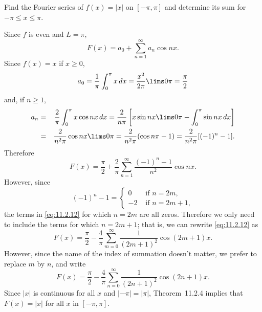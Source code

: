 \setcounter{example}{4}
\begin{example}
  \label{example:11.2.5} \rm Find the Fourier series of $f(x)=|x|$ on $[-\pi,\pi]$ and determine its sum for\\ $-\pi\le x\le\pi$.
\end{example}
\setcounter{equation}{11}
\begin{examplesolution}
\solution Since $f$ is even and $L=\pi$,
\[
  F(x)=a_{0}+\sum_{n=1}^{\infty}a_{n}\cos nx.
\]
Since $f(x)=x$ if $x\ge0$,
\[
  a_{0}=\frac{1}{\pi}\int_{0}^{\pi}x\,dx=\frac{x^{2}}{2\pi}\lims0\pi=\frac{\pi}{2}
\]
and, if $n\ge1$,
\begin{eqnarray*}
  a_{n} & = & \frac{2}{\pi}\int_{0}^{\pi}x\cos nx\,dx=\frac{2}{n\pi}\left[x\sin nx\lims0\pi-\int_{0}^{\pi}\sin nx\,dx\right] \\
        & = & \frac{2}{n^{2}\pi}\cos nx\lims0\pi=\frac{2}{n^{2}\pi}(\cos n\pi-1)=\frac{2}{n^{2}\pi}[(-1)^{n}-1].
\end{eqnarray*}
Therefore
\begin{equation}
  \label{eq:11.2.12}F(x)=\frac{\pi}{2}+\frac{2}{\pi}\sum_{n=1}^{\infty}\frac{(-1)^{n}-1}{n^{2}}\cos nx.
\end{equation}
However, since
\[
  (-1)^{n}-1= \left\{
  \begin{array}{rl}
    0  & \mbox{ if }n=2m,   \\
    -2 & \mbox{ if }n=2m+1,
  \end{array}\right.
\]
the terms in \eqref{eq:11.2.12} for which $n=2m$ are all zeros. Therefore we only need to include the
terms for which $n=2m+1$; that is, we can rewrite \eqref{eq:11.2.12} as
\[
  F(x)=\frac{\pi}{2}-\frac{4}{\pi}\sum_{m=0}^{\infty}\frac{1}{(2m+1)^{2}}\cos(2m+1)x.
\]
However, since the name of the index of summation doesn't matter, we prefer to replace $m$ by $n$,
and write
\[
  F(x)=\frac{\pi}{2}-\frac{4}{\pi}\sum_{n=0}^{\infty}\frac{1}{(2n+1)^{2}}\cos(2n+1)x.
\]
Since $|x|$ is continuous for all $x$ and $|-\pi|=|\pi|$, Theorem~11.2.4 implies that
$F(x)=|x|$ for all $x$ in $[-\pi,\pi]$.
\end{examplesolution}

